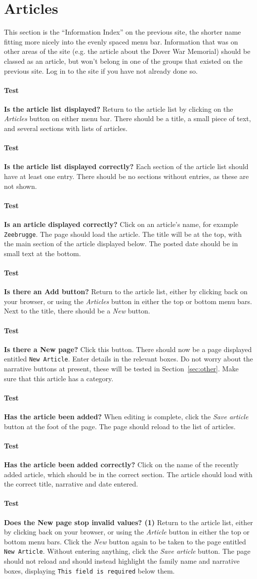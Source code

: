 \documentclass[12pt]{article}
\newcounter{Test}
\newcommand{\test}[1]{%
\stepcounter{Test}%
\paragraph{Test \theTest} \textbf{#1} }
\begin{document}
\section{Articles}\label{sec:article}
This section is the ``Information Index'' on the previous site, the shorter name fitting more nicely into the evenly spaced menu bar. Information that was on other areas of the site (e.g. the article about the Dover War Memorial) should be classed as an article, but won't belong in one of the groups that existed on the previous site. Log in to the site if you have not already done so.

\test{Is the article list displayed?}
Return to the article list by clicking on the \textit{Articles} button on either menu bar. There should be a title, a small piece of text, and several sections with lists of articles.

\test{Is the article list displayed correctly?}
Each section of the article list should have at least one entry. There should be no sections without entries, as these are not shown.

\test{Is an article displayed correctly?}
Click on an article's name, for example \texttt{Zeebrugge}. The page should load the article. The title will be at the top, with the main section of the article displayed below. The posted date should be in small text at the bottom.

\test{Is there an Add button?}
Return to the article list, either by clicking back on your browser, or using the \textit{Articles} button in either the top or bottom menu bars. Next to the title, there should be a \textit{New} button.

\test{Is there a New page?}
Click this button. There should now be a page displayed entitled \texttt{New Article}. Enter details in the relevant boxes. Do not worry about the narrative buttons at present, these will be tested in Section~\ref{sec:other}. Make sure that this article has a category.

\test{Has the article been added?}
When editing is complete, click the \textit{Save article} button at the foot of the page. The page should reload to the list of articles.

\test{Has the article been added correctly?}
Click on the name of the recently added article, which should be in the correct section. The article should load with the correct title, narrative and date entered.

\test{Does the New page stop invalid values? (1)}
Return to the article list, either by clicking back on your browser, or using the \textit{Article} button in either the top or bottom menu bars. Click the \textit{New} button again to be taken to the page entitled \texttt{New Article}. Without entering anything, click the \textit{Save article} button. The page should not reload and should instead highlight the family name and narrative boxes, displaying \texttt{This field is required} below them.
\end{document}
